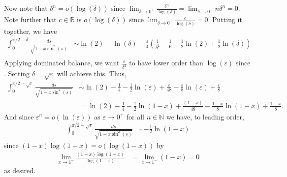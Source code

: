 \documentclass{article}
\begin{document}
\begin{itemize}
\begin{itemize}
        Now note that $\delta^n = o(\log(\delta))$ since $\lim_{\delta \to 0^+} \frac{\delta^n}{\log(\delta)} = \lim_{\delta \to 0^+} n\delta^n = 0$. Note further that $c \in \mathbb{R}$ is $o(\log(\delta))$ since $\lim_{\delta \to 0^+} \frac{c}{\log(\delta)} = 0$. 
        Putting it together, we have
        \begin{align*}
            \int_0^{\pi/2 - \delta} \frac{ds}{\sqrt{1 - x\sin^2(s)}} &\sim \ln(2) - \ln(\delta) - \frac{\varepsilon}{4}\left(\frac{1}{\delta^2} - \frac{1}{6} - \frac{1}{2}\ln(2) + \frac{1}{2}\ln(\delta)\right)\\
        \end{align*}
        Applying dominated balance, we want $\frac{\varepsilon}{\delta^2}$ to have lower order than $\log(\varepsilon)$ since . Setting $\delta = \sqrt{\varepsilon}$ will achieve this. Thus, 
        \begin{align*}
            \int_0^{\pi/2 - \sqrt{\varepsilon}} \frac{ds}{\sqrt{1 - x\sin^2(s)}} &\sim \ln(2) - \frac{1}{4} -\frac{1}{2}\ln(\varepsilon) + \frac{\varepsilon}{48} - \frac{\varepsilon}{8}\ln(\varepsilon) + \frac{\varepsilon}{8}\\
            &= \ln(2) - \frac{1}{4} - \frac{1}{2}\ln(1 - x) + \frac{(1-x)}{48} - \frac{1 - x}{8}\ln(1-x) + \frac{1 - x}{8}.
        \end{align*}
        And since $\varepsilon^n = o(\ln(\varepsilon))$ as $\varepsilon \to 0^+$ for all $n \in \mathbb{N}$ we have, to leading order,
        \begin{align*}
            \int_0^{\pi/2 - \sqrt{\varepsilon}} \frac{ds}{\sqrt{1 - x\sin^2(s)}} &\sim -\frac{1}{2}\ln(1-x) 
        \end{align*}
        since $(1 - x)\log(1 - x) = o(\log(1-x))$ by 
        \begin{align*}
            \lim_{x \to 1^-} \frac{(1-x)\log(1-x)}{\log(1-x)} &= \lim_{x \to 1^-} (1-x) = 0
        \end{align*}
        as desired.
        \newline\newline
 

\end{itemize}
\end{itemize}
\end{document}
